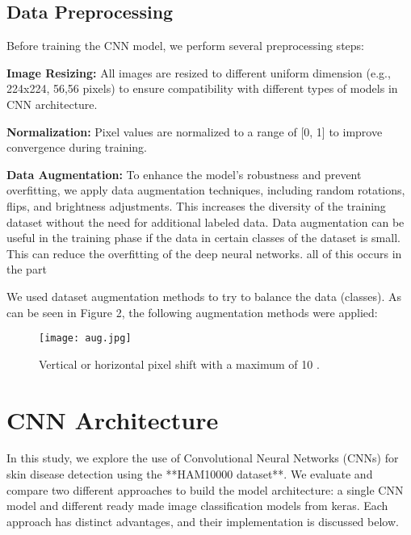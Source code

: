 \documentclass{article}
\begin{document}
\subsection{Data Preprocessing}
Before training the CNN model, we perform several preprocessing steps:
    \item \textbf{Image Resizing:} All images are resized to different uniform dimension (e.g., 224x224, 56,56 pixels) to ensure compatibility with different types of models in CNN architecture.
    \item \textbf{Normalization:} Pixel values are normalized to a range of [0, 1] to improve convergence during training.
    \item \textbf{Data Augmentation:} To enhance the model's robustness and prevent overfitting, we apply data augmentation techniques, including random rotations, flips, and brightness adjustments. This increases the diversity of the training dataset without the need for additional labeled data. Data augmentation can be useful in the training phase if the data in certain classes of the dataset is small. This can reduce the overfitting of the deep neural networks. 
    all of this occurs in the part 
 
We used dataset augmentation methods to try to balance the data (classes). As can be seen in Figure 2, the following augmentation methods were applied:



\begin{figure}[h!]
    \centering
    \texttt{[image: aug.jpg]}
    \caption{Vertical or horizontal pixel shift with a maximum of 10
.}
    \label{fig:skin_lesion_example}
\end{figure}



\section{CNN Architecture}

In this study, we explore the use of Convolutional Neural Networks (CNNs) for skin disease detection using the **HAM10000 dataset**. We evaluate and compare two different approaches to build the model architecture: a single CNN model and different ready made image classification models from keras. Each approach has distinct advantages, and their implementation is discussed below.
\end{document}
